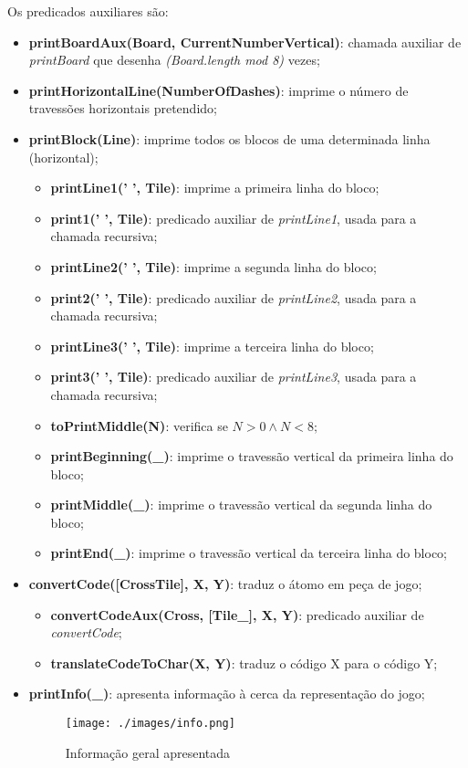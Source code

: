 \documentclass[a4paper]{article}
\begin{document}
Os predicados auxiliares são:
\begin{itemize}

	\item \textbf{printBoardAux(Board, CurrentNumberVertical)}: chamada auxiliar de \textit{printBoard} que desenha \textit{(Board.length mod 8)} vezes;	
	\item \textbf{printHorizontalLine(NumberOfDashes)}: imprime o número de travessões horizontais pretendido;
	\item \textbf{printBlock(Line)}: imprime todos os blocos de uma determinada linha (horizontal);
	\begin{itemize}
		\item \textbf{printLine1(' ', Tile)}: imprime a primeira linha do bloco;
		\item \textbf{print1(' ', Tile)}: predicado auxiliar de \textit{printLine1}, usada para a chamada recursiva;
		\item \textbf{printLine2(' ', Tile)}: imprime a segunda linha do bloco;
		\item \textbf{print2(' ', Tile)}: predicado auxiliar de \textit{printLine2}, usada para a chamada recursiva;
		\item \textbf{printLine3(' ', Tile)}: imprime a terceira linha do bloco;
		\item \textbf{print3(' ', Tile)}: predicado auxiliar de \textit{printLine3}, usada para a chamada recursiva;
		\item \textbf{toPrintMiddle(N)}: verifica se 
		\begin{math}
			N>0 \wedge N<8;
		\end{math}
		\item \textbf{printBeginning(\_)}: imprime o travessão vertical da primeira linha do bloco;
		\item \textbf{printMiddle(\_)}: imprime o travessão vertical da segunda linha do bloco;
		\item \textbf{printEnd(\_)}: imprime o travessão vertical da terceira linha do bloco;
	\end{itemize}
	\item \textbf{convertCode([Cross\textbar Tile], X, Y)}: traduz o átomo em peça de jogo;
	\begin{itemize}
		\item \textbf{convertCodeAux(Cross, [Tile\textbar \_], X, Y)}: predicado auxiliar de \textit{convertCode};
		\item \textbf{translateCodeToChar(X, Y)}: traduz o código X para o código Y;
	\end{itemize}
	\item \textbf{printInfo(\_)}: apresenta informação à cerca da representação do jogo;
	
	\begin{figure}[h!]
		\begin{center}
			\texttt{[image: ./images/info.png]}
			\caption{Informação geral apresentada}
			\label{fig:8}
		\end{center}
	\end{figure}

\end{itemize}
\vspace{10 mm}
\end{document}
